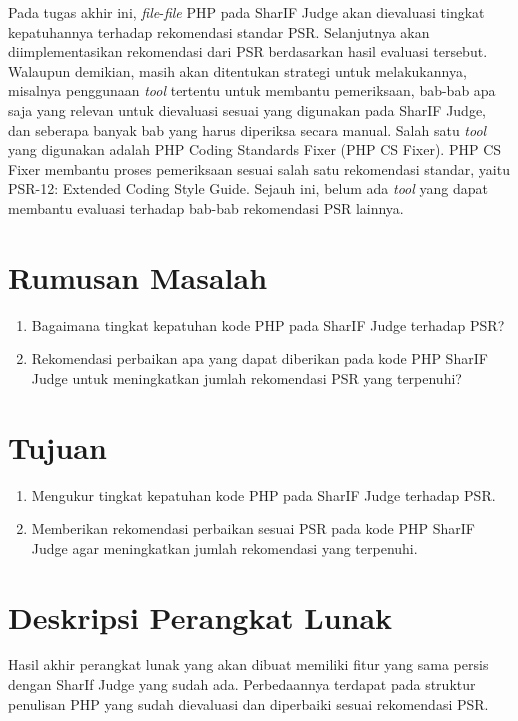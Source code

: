 \documentclass[a4paper,twoside]{article}
\begin{document}
	Pada tugas akhir ini, \textit{file}-\textit{file} PHP pada SharIF Judge akan dievaluasi tingkat kepatuhannya terhadap rekomendasi standar PSR. Selanjutnya akan diimplementasikan rekomendasi dari PSR berdasarkan hasil evaluasi tersebut. Walaupun demikian, masih akan ditentukan strategi untuk melakukannya, misalnya penggunaan \textit{tool} tertentu untuk membantu pemeriksaan, bab-bab apa saja yang relevan untuk dievaluasi sesuai yang digunakan pada SharIF Judge, dan seberapa banyak bab yang harus diperiksa secara manual. Salah satu \textit{tool} yang digunakan adalah PHP Coding Standards Fixer (PHP CS Fixer). PHP CS Fixer membantu proses pemeriksaan sesuai salah satu rekomendasi standar, yaitu PSR-12: Extended Coding Style Guide. Sejauh ini, belum ada \textit{tool} yang dapat membantu evaluasi terhadap bab-bab rekomendasi PSR lainnya.
	
	\section{Rumusan Masalah}
	\begin{enumerate}
		\item Bagaimana tingkat kepatuhan kode PHP pada SharIF Judge terhadap PSR?  
		\item Rekomendasi perbaikan apa yang dapat diberikan pada kode PHP SharIF Judge untuk meningkatkan jumlah rekomendasi PSR yang terpenuhi?
	\end{enumerate}
	
	\section{Tujuan}
	\begin{enumerate}
		\item Mengukur tingkat kepatuhan kode PHP pada SharIF Judge terhadap PSR.
		\item Memberikan rekomendasi perbaikan sesuai PSR pada kode PHP SharIF Judge agar meningkatkan jumlah rekomendasi yang terpenuhi. 
	\end{enumerate}
	
	\section{Deskripsi Perangkat Lunak}
	Hasil akhir perangkat lunak yang akan dibuat memiliki fitur yang sama persis dengan SharIf Judge yang sudah ada. Perbedaannya terdapat pada struktur penulisan PHP yang sudah dievaluasi dan diperbaiki sesuai rekomendasi  PSR. 
	
\end{document}
